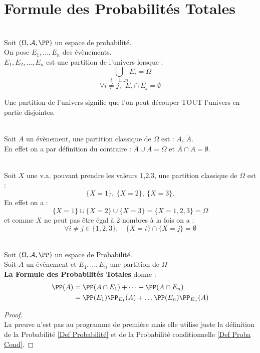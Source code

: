 \documentclass[12pt,fleqn]{report} %
\begin{document}
\section{Formule des Probabilités Totales}
\begin{definition}\text{ }\\
	Soit $(\Omega,\mathcal{A},\PP)$ un espace de probabilité.\\ On pose $E_1,\dots,E_n$ des évènements. \\ $E_1,E_2,\dots,E_n$ est une partition de l'univers lorsque :\[
	\bigcup\limits_{i = 1 \dots n} E_i = \Omega
	\]
	\[
	\forall i\neq j, \  \ E_i \cap E_j = \emptyset
	\]
\end{definition}
Une partition de l'univers signifie que l'on peut découper TOUT l'univers en partie disjointes.
\begin{example}\text{ }\\
	Soit $A$ un évènement, une partition classique de $\Omega$ est : $A$, $\overline{A}$.\\
	En effet on a par définition du contraire : $\overline{A} \cup A = \Omega$ et $\overline{A} \cap A = \emptyset$.
\end{example}
\begin{example}\text{ }\\
	Soit $X$ une v.a. pouvant prendre les valeurs 1,2,3, une partition classique de $\Omega$ est : \[
	\lbrace X = 1 \rbrace, \ \lbrace X = 2 \rbrace, \ \lbrace X = 3 \rbrace.
	\]
	En effet on a : \[
	\lbrace X = 1 \rbrace \cup \lbrace X = 2 \rbrace \cup\lbrace X = 3 \rbrace = \lbrace X = 1,2,3 \rbrace = \Omega
	\]
	et comme $X$ ne peut pas être égal à 2 nombres à la fois on a :
	\[
	\forall i\neq j \in \lbrace 1,2,3 \rbrace , \quad \lbrace X = i \rbrace \cap \lbrace X = j \rbrace = \emptyset
	\]
\end{example}

\begin{proposition}\text{ }\\
	Soit $(\Omega,\mathcal{A},\PP)$ un espace de Probabilité. \\ Soit $A$ un évènement et $E_1,\dots,E_n$ une partition de $\Omega$ \\
	\textbf{La Formule des Probabilités Totales} donne :\begin{align*}
	\PP(A) & = \PP(A \cap E_1) + \dots + \PP(A \cap E_n) \\ 
	& = \PP(E_1)\PP_{E_1}(A) + \dots \PP(E_n)\PP_{E_n}(A)
	\end{align*}
\end{proposition}
\begin{proof}\text{ }\\
	La preuve n'est pas au programme de première mais elle utilise juste la définition de la Probabilité \ref{Def Probabilité} et de la Probabilité conditionnelle \ref{Def Proba Cond}.
\end{proof}
\end{document}
